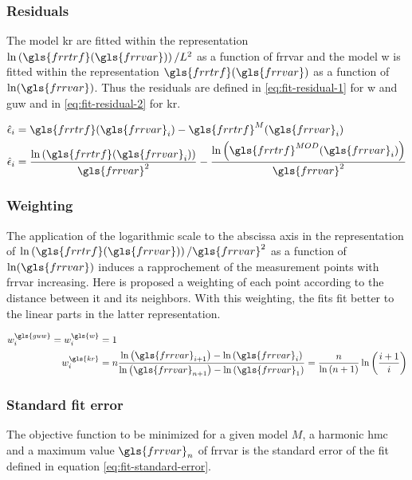 \subsubsection{Residuals}

The model \gls{kr} are fitted within the representation \( \ln \left( \gls{frrtrf}(\gls{frrvar}) \right)/L^2 \) as a function of \gls{frrvar} and the model \gls{w} is fitted within the representation \( \gls{frrtrf}(\gls{frrvar}) \) as a function of \( \ln(\gls{frrvar}) \).
Thus the residuals are defined in \eqref{eq:fit-residual-1} for \gls{w} and \gls{guw} and in \eqref{eq:fit-residual-2} for \gls{kr}.

\begin{align}
\hat{\epsilon}_i &=
\gls{frrtrf}(\gls{frrvar}_i) - \gls{frrtrf}^{M}(\gls{frrvar}_i) \label{eq:fit-residual-1} \\
\hat{\epsilon}_i &=
\frac{\ln\left(\gls{frrtrf}(\gls{frrvar}_i)\right)}{\gls{frrvar}^2} -
\frac{\ln\left(\gls{frrtrf}^{MOD}(\gls{frrvar}_i)\right)}{\gls{frrvar}^2} \label{eq:fit-residual-2}
\end{align}

\subsubsection{Weighting}
The application of the logarithmic scale to the abscissa axis in the representation of \( \ln \left( \gls{frrtrf}(\gls{frrvar}) \right) / \gls{frrvar}^2 \) as a function of \( \ln(\gls{frrvar}) \) induces a rapprochement of the measurement points with \gls{frrvar} increasing.
Here is proposed a weighting of each point according to the distance between it and its neighbors.
With this weighting, the fits fit better to the linear parts in the latter representation.

\begin{align}
w^{\gls{guw}}_i = w^{\gls{w}}_i &= 1 \\
w^{\gls{kr}}_i &=
n
\frac{
\ln \left(\gls{frrvar}_{i + 1} \right) - \ln \left(\gls{frrvar}_i\right)
}{
\ln \left(\gls{frrvar}_{n + 1} \right) - \ln \left(\gls{frrvar}_1\right)
} =
\frac{n}{\ln \left( n + 1 \right)} \ln \left( \frac{i+1}{i} \right)
\end{align}

\subsubsection{Standard fit error}
The objective function to be minimized for a given model \( M \), a harmonic \gls{hmc} and a maximum value \( \gls{frrvar}_n \) of \gls{frrvar} is the standard error of the fit defined in equation \eqref{eq:fit-standard-error}.

